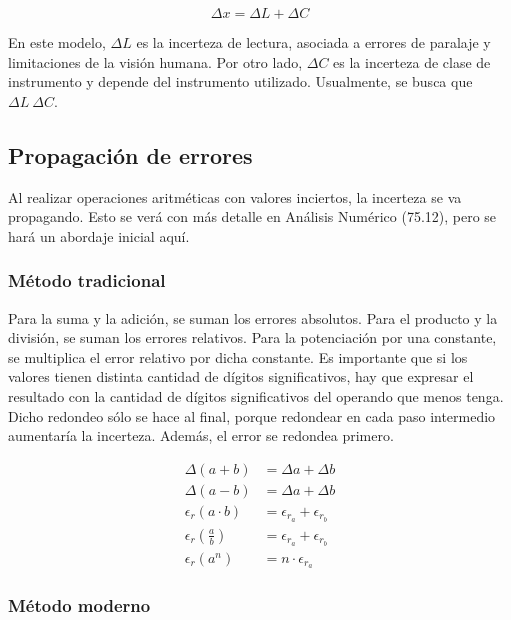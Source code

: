 \documentclass{article}
\begin{document}
\begin{equation}
\Delta x = \Delta L + \Delta C
\end{equation}

En este modelo, $\Delta L$ es la incerteza de lectura, asociada a errores de paralaje y limitaciones de la visión humana. Por otro lado, $\Delta C$ es la incerteza de clase de instrumento y depende del instrumento utilizado. Usualmente, se busca que $\Delta L ~ \Delta C$.

\subsection{Propagación de errores}

Al realizar operaciones aritméticas con valores inciertos, la incerteza se va propagando. Esto se verá con más detalle en Análisis Numérico (75.12), pero se hará un abordaje inicial aquí.

\subsubsection{Método tradicional}

Para la suma y la adición, se suman los errores absolutos. Para el producto y la división, se suman los errores relativos. Para la potenciación por una constante, se multiplica el error relativo por dicha constante. Es importante que si los valores tienen distinta cantidad de dígitos significativos, hay que expresar el resultado con la cantidad de dígitos significativos del operando que menos tenga. Dicho redondeo sólo se hace al final, porque redondear en cada paso intermedio aumentaría la incerteza. Además, el error se redondea primero.

\begin{subequations}
\begin{align}
\Delta (a + b) &= \Delta a + \Delta b \\
\Delta (a - b) &= \Delta a + \Delta b \\
\epsilon_r (a \cdot b) &= \epsilon_{r_a} + \epsilon_{r_b} \\
\epsilon_r \left( \frac{a}{b} \right) &= \epsilon_{r_a} + \epsilon_{r_b} \\
\epsilon_r (a^n) &= n \cdot \epsilon_{r_a}
\end{align}
\end{subequations}

\subsubsection{Método moderno}
\end{document}
